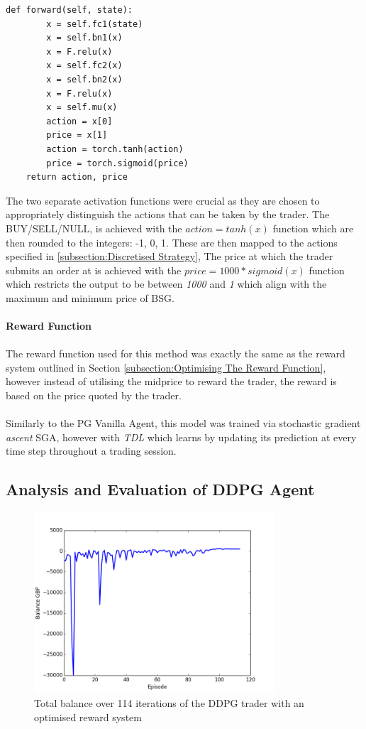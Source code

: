 \documentclass[ %
                    author={Ashwinder Khurana},
                supervisor={Prof Dave Cliff},
                    degree={MEng},
                     title={The Deeply Reinforced Trader},
                  subtitle={},
                      type={enterprise},
                      year={2020} ]{dissertation}
\begin{document}
{\begin{lstlisting}[label=actor-forward-pass, caption = Forward pass for the Actor Model]
def forward(self, state):
        x = self.fc1(state)
        x = self.bn1(x)
        x = F.relu(x)
        x = self.fc2(x)
        x = self.bn2(x)
        x = F.relu(x)
        x = self.mu(x)
        action = x[0]
        price = x[1]
        action = torch.tanh(action)
        price = torch.sigmoid(price)
	return action, price
\end{lstlisting}
\noindent
The two separate activation functions were crucial as they are chosen to appropriately distinguish the actions that can be taken by the trader. The BUY/SELL/NULL, is achieved with the $action = tanh(x)$ function which are then rounded to the integers: -1, 0, 1. These are then mapped to the actions specified in \ref{subsection:Discretised Strategy}, The price at which the trader submits an order at is achieved with the $price = 1000*sigmoid(x)$ function which restricts the output to be between \textit{1000} and \textit{1} which align with the maximum and minimum price of BSG. 
\\
\\
\textbf{Reward Function}
\\
\\
\noindent
The reward function used for this method was exactly the same as the reward system outlined in Section \ref{subsection:Optimising The Reward Function}, however instead of utilising the midprice to reward the trader, the reward is based on the price quoted by the trader. 
\\
\\
\noindent
Similarly to the PG Vanilla Agent, this model was trained via stochastic gradient \textit{ascent} SGA, however with \textit{TDL} which learns by updating its prediction at every time step throughout a trading session. 
\subsection{Analysis and Evaluation of DDPG Agent}
\label{subsection:Analysis and Evaluation of DDPG Agent}
\begin{figure}[H]
	\centering
  	\includegraphics[width=0.8\textwidth]{DDPG-Balance}
  	\caption{Total balance over 114 iterations of the DDPG trader with an optimised reward system }
	\label{fig:DDPG-Balance}  
\end{figure}




}
\end{document}
